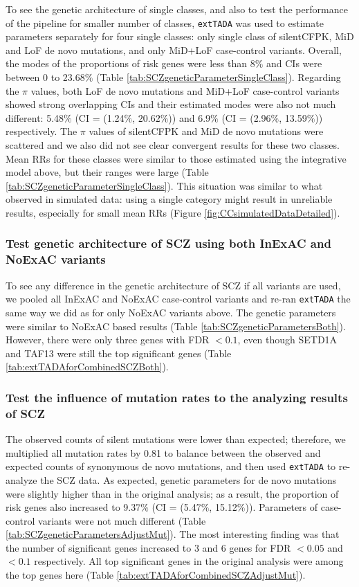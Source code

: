 \documentclass[]{article}
\begin{document}
To see the genetic architecture of single classes, and also to test the performance of the pipeline for smaller
number of classes, \texttt{extTADA} was used to estimate parameters separately for four
single classes: only single class of silentCFPK, MiD and LoF de novo
mutations, and only MiD+LoF case-control variants. Overall, the modes of the proportions of risk genes were
less than 8$\%$ and CIs were between 0 to 23.68$\%$ (Table
\ref{tab:SCZgeneticParameterSingleClass}). Regarding the $\pi$ values,
both LoF de novo mutations and MiD+LoF case-control variants showed strong overlapping CIs and
their estimated modes were also not much different: 5.48$\%$ (CI =
(1.24$\%$, $20.62\%$)) and 6.9$\%$ (CI = (2.96$\%$, 13.59$\%$))
respectively. The $\pi$ values of silentCFPK and MiD de novo mutations
were scattered and we also did not see clear convergent results for these
two classes. Mean RRs for these classes were similar to those
estimated using the integrative model above, but their ranges were
large (Table \ref{tab:SCZgeneticParameterSingleClass}). This situation
was similar to what observed in simulated data: using a single category
might result in unreliable results, especially for small mean RRs
(Figure \ref{fig:CCsimulatedDataDetailed}).

\subsubsection{Test genetic architecture of SCZ using both InExAC and
  NoExAC variants}

To see any difference in the genetic architecture of SCZ if all variants
are used, we pooled all InExAC and NoExAC case-control variants and
re-ran \texttt{extTADA} the same way we did as for only NoExAC variants
above. The genetic parameters were similar to NoExAC based results
(Table \ref{tab:SCZgeneticParametersBoth}). However, there were only
three genes with FDR $< 0.1$, even though SETD1A and TAF13 were
still the top significant genes (Table \ref{tab:extTADAforCombinedSCZBoth}).

\subsubsection{Test the influence of mutation rates to the analyzing
  results of SCZ}

The observed counts of silent mutations were lower than expected; therefore,
we multiplied all mutation rates by 0.81 to balance between the observed
and expected counts of synonymous de novo mutations, and then used
\texttt{extTADA} to re-analyze the SCZ data. As expected, genetic parameters
for de novo mutations were slightly higher than in the original analysis;
as a result, the proportion of risk genes also increased to 9.37$\%$
(CI = (5.47$\%$, 15.12$\%$)). Parameters of case-control variants were
not much different (Table
\ref{tab:SCZgeneticParametersAdjustMut}). The most interesting finding was
that the number of significant genes increased to 3 and 6 genes for
FDR $<0.05$ and $<0.1$ respectively. All top significant genes in the
original analysis were among the top genes here (Table \ref{tab:extTADAforCombinedSCZAdjustMut}).
\end{document}
